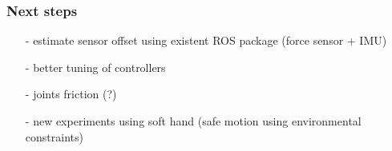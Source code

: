 \begin{frame}
  \frametitle{Next steps}
  \begin{itemize}
  \item[-] estimate sensor offset using existent ROS package (force sensor + IMU)
  \item[-] better tuning of controllers
  \item[-] joints friction (?)
  \item[-] new experiments using soft hand (safe motion using environmental constraints)
  \end{itemize}
\end{frame}
